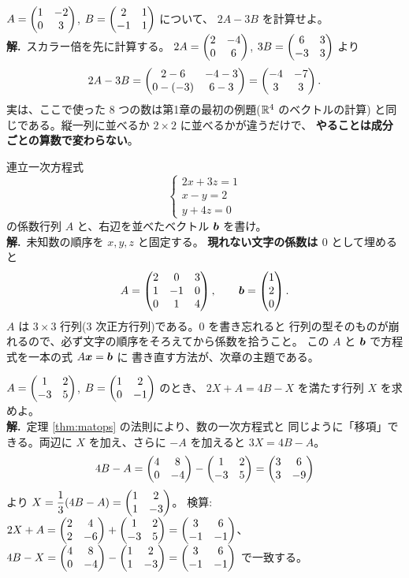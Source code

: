 \begin{rei}[例題・基本(計算)]
$A = \begin{pmatrix}1 & -2 \\ 0 & 3\end{pmatrix}$, $B = \begin{pmatrix}2 & 1 \\ -1 & 1\end{pmatrix}$ について、
$2A - 3B$ を計算せよ。\\
\textbf{解.}\ スカラー倍を先に計算する。
$2A = \begin{pmatrix}2 & -4 \\ 0 & 6\end{pmatrix}$, $3B = \begin{pmatrix}6 & 3 \\ -3 & 3\end{pmatrix}$ より
\[
2A - 3B = \begin{pmatrix}2 - 6 & -4 - 3 \\ 0 - (-3) & 6 - 3\end{pmatrix} = \begin{pmatrix}-4 & -7 \\ 3 & 3\end{pmatrix}.
\]
実は、ここで使った $8$ つの数は第1章の最初の例題($\mathbb{R}^4$ のベクトルの計算)
と同じである。縦一列に並べるか $2 \times 2$ に並べるかが違うだけで、
\textbf{やることは成分ごとの算数で変わらない}。
\end{rei}

\begin{rei}[例題・基本(係数行列を作る)]
連立一次方程式
\[
\begin{cases}
2x + 3z = 1 \\
x - y = 2 \\
y + 4z = 0
\end{cases}
\]
の係数行列 $A$ と、右辺を並べたベクトル $\bm{b}$ を書け。\\
\textbf{解.}\ 未知数の順序を $x, y, z$ と固定する。
\textbf{現れない文字の係数は $0$} として埋めると
\[
A = \begin{pmatrix}2 & 0 & 3 \\ 1 & -1 & 0 \\ 0 & 1 & 4\end{pmatrix}, \qquad
\bm{b} = \begin{pmatrix}1 \\ 2 \\ 0\end{pmatrix}.
\]
$A$ は $3 \times 3$ 行列($3$ 次正方行列)である。$0$ を書き忘れると
行列の型そのものが崩れるので、必ず文字の順序をそろえてから係数を拾うこと。
この $A$ と $\bm{b}$ で方程式を一本の式 $A\bm{x} = \bm{b}$ に
書き直す方法が、次章の主題である。
\end{rei}

\begin{rei}[例題・標準(行列の方程式)]
$A = \begin{pmatrix}1 & 2 \\ -3 & 5\end{pmatrix}$, $B = \begin{pmatrix}1 & 2 \\ 0 & -1\end{pmatrix}$ のとき、
$2X + A = 4B - X$ を満たす行列 $X$ を求めよ。\\
\textbf{解.}\ 定理 \ref{thm:matops} の法則により、数の一次方程式と
同じように「移項」できる。両辺に $X$ を加え、さらに $-A$ を加えると
$3X = 4B - A$。
\[
4B - A = \begin{pmatrix}4 & 8 \\ 0 & -4\end{pmatrix} - \begin{pmatrix}1 & 2 \\ -3 & 5\end{pmatrix}
= \begin{pmatrix}3 & 6 \\ 3 & -9\end{pmatrix}
\]
より $X = \dfrac{1}{3}(4B - A) = \begin{pmatrix}1 & 2 \\ 1 & -3\end{pmatrix}$。
検算:$2X + A = \begin{pmatrix}2 & 4 \\ 2 & -6\end{pmatrix} + \begin{pmatrix}1 & 2 \\ -3 & 5\end{pmatrix}
= \begin{pmatrix}3 & 6 \\ -1 & -1\end{pmatrix}$、
$4B - X = \begin{pmatrix}4 & 8 \\ 0 & -4\end{pmatrix} - \begin{pmatrix}1 & 2 \\ 1 & -3\end{pmatrix}
= \begin{pmatrix}3 & 6 \\ -1 & -1\end{pmatrix}$ で一致する。
\end{rei}

